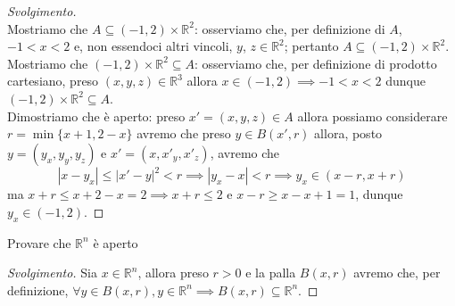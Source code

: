 \begin{proof}[Svolgimento] \hspace{1cm} \\
	Mostriamo che $A \subseteq (-1, 2) \times \mathbb{R}^2$: osserviamo che, per definizione di $A$, $-1<x<2$ e, non essendoci altri vincoli, $y$, $z \in \mathbb{R}^2$; pertanto $A \subseteq (-1, 2) \times \mathbb{R}^2$. \\
	Mostriamo che $(-1, 2) \times \mathbb{R}^2 \subseteq A$: osserviamo che, per definizione di prodotto cartesiano, preso $(x, y, z) \in \mathbb{R}^3$ allora $x \in (-1, 2) \implies -1 < x < 2$ dunque $(-1, 2) \times \mathbb{R}^2 \subseteq A$. \\
	Dimostriamo che è aperto: preso $x'=(x, y, z) \in A$ allora possiamo considerare $r = \min{ \{x+1, 2-x \} }$ avremo che preso $y \in B(x', r)$ allora, posto $y=(y_x, y_y, y_z)$ e $x'=(x, x'_y, x'_z)$, avremo che
	$$
	|x - y_x| \leq |x'-y|^2 < r \implies |y_x - x| < r \implies y_x \in (x - r, x + r) 
	$$
	ma $x + r \leq x + 2 - x = 2 \implies x + r \leq 2$ e $x - r \geq x - x + 1 = 1$, dunque $y_x \in (-1, 2)$.
\end{proof}
\begin{exercise}
	Provare che $\mathbb{R}^n$ è aperto
\end{exercise}
\begin{proof}[Svolgimento]
	Sia $x \in \mathbb{R}^n$, allora preso $r > 0$ e la palla $B(x, r)$ avremo che, per definizione, $\forall y \in B(x, r), y \in \mathbb{R}^n \implies B(x, r) \subseteq \mathbb{R}^n$.
\end{proof}

